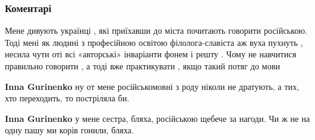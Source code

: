  
 
 
 
 
\subsubsection{Коментарі}

\begin{itemize}
 

Мене дивують українці , які приїхавши до міста почитають говорити російською.
Тоді мені як людині з професійною освітою філолога-славіста аж вуха пухнуть ,
несила чути оті всі «авторські» інваріанти фонем і решту . Чому не навчитися
правильно говорити , а тоді вже практикувати , якщо такий потяг до мови

\begin{itemize}
 
\textbf{Inna Gurinenko} ну от мене російськомовні з роду ніколи не дратують, а тих, хто переходить, то постріляла би.

 
\textbf{Inna Gurinenko} у мене сестра, бляха, російською щебече за нагоди. Чи ж
не на одну пашу ми корів гонили, бляха.

 

\end{itemize}
\end{itemize}
